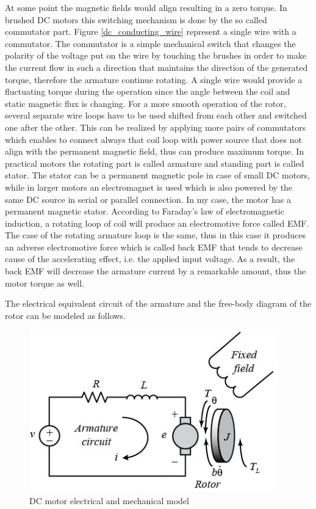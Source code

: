\documentclass[12pt,english,twoside]{article}
\begin{document}
At some point the magnetic fields would align resulting in a zero torque. In brushed DC motors this switching mechanism is done by the so called commutator part. Figure \ref{dc_conducting_wire} represent a single wire with a commutator. The commutator is a simple mechanical switch that changes the polarity of the voltage put on the wire by touching the brushes in order to make the current flow in such a direction that maintains the direction of the generated torque, therefore the armature continue rotating. A single wire would provide a fluctuating torque during the operation since the angle between the coil and static magnetic flux is changing. For a more smooth operation of the rotor, several separate wire loops have to be used shifted from each other and switched one after the other. This can be realized by applying more pairs of commutators which enables to connect always that coil loop with power source that does not align with the permanent magnetic field, thus can produce maximum torque. In practical motors the rotating part is called armature and standing part is called stator. The stator can be a permanent magnetic pole in case of small DC motors, while in larger motors an electromagnet is used which is also powered by the same DC source in serial or parallel connection. In my case, the motor has a permanent magnetic stator.
According to Faraday's law of electromagnetic induction, a rotating loop of coil will produce an electromotive force called EMF. The case of the rotating armature loop is the same, thus in this case it produces an adverse electromotive force which is called back EMF that tends to decrease cause of the accelerating effect, i.e. the applied input voltage. As a result, the back EMF will decrease the armature current by a remarkable amount, thus the motor torque as well. \cite{dc_motor_1} \cite{dc_motor_2}

The electrical equivalent circuit of the armature and the free-body diagram of the rotor can be modeled as follows.
\begin{figure}[htb!]
	\centering
	\includegraphics[height=7cm]{figures/dc_motor_model.png}
	\caption{DC motor electrical and mechanical model \cite{dc_motor_3}}
	\label{dc_motor_model}
\end{figure}
\end{document}
